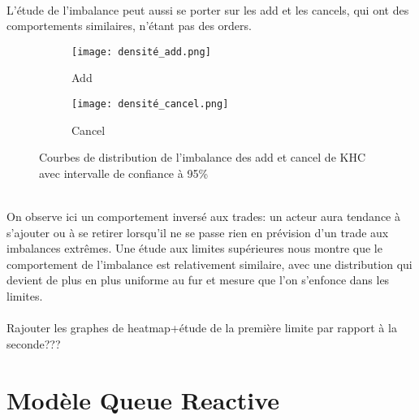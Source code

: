 \documentclass[12pt,a4paper]{article}
\theoremstyle{definition}
\theoremstyle{remark}
\begin{document}
\\
L'étude de l'imbalance peut aussi se porter sur les add et les cancels, qui ont des comportements similaires, n'étant pas des orders.
\begin{figure}[h!]
    \centering
    \begin{subfigure}[b]{0.48\textwidth}
        \centering
        \texttt{[image: densité\_add.png]}
        \caption{Add}
        \label{fig:imbalance}
    \end{subfigure}
    \hfill
    \begin{subfigure}[b]{0.48\textwidth}
        \centering
        \texttt{[image: densité\_cancel.png]}
        \caption{Cancel}
        \label{fig:densite_imbalance}
    \end{subfigure}
    \caption{Courbes de distribution de l'imbalance des add et cancel de KHC avec intervalle de confiance à 95\%}
    \label{fig:comparison}
\end{figure}
\\
On observe ici un comportement inversé aux trades: un acteur aura tendance à s'ajouter ou à se retirer lorsqu'il ne se passe rien en prévision d'un trade aux imbalances extrêmes. Une étude aux limites supérieures nous montre que le comportement de l'imbalance est relativement similaire, avec une distribution qui devient de plus en plus uniforme au fur et mesure que l'on s'enfonce dans les limites.
\\
\\
Rajouter les graphes de heatmap+étude de la première limite par rapport à la seconde???




\newpage
\section{Modèle Queue Reactive}
\end{document}

